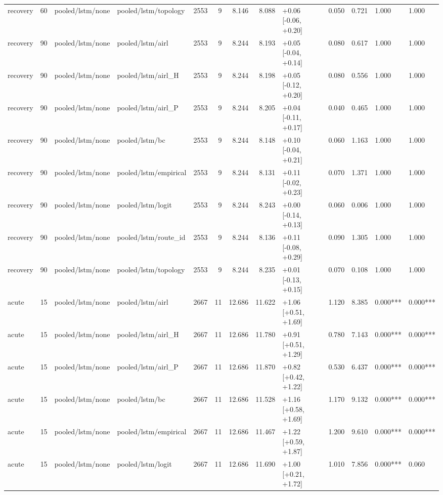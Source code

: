 \begin{tabular}{lrllrrrrlrrll}
recovery & 60 & pooled/lstm/none & pooled/lstm/topology & 2553 & 9 & 8.146 & 8.088 & +0.06 [-0.06, +0.20] & 0.050 & 0.721 & 1.000 & 1.000 \\
recovery & 90 & pooled/lstm/none & pooled/lstm/airl & 2553 & 9 & 8.244 & 8.193 & +0.05 [-0.04, +0.14] & 0.080 & 0.617 & 1.000 & 1.000 \\
recovery & 90 & pooled/lstm/none & pooled/lstm/airl_H & 2553 & 9 & 8.244 & 8.198 & +0.05 [-0.12, +0.20] & 0.080 & 0.556 & 1.000 & 1.000 \\
recovery & 90 & pooled/lstm/none & pooled/lstm/airl_P & 2553 & 9 & 8.244 & 8.205 & +0.04 [-0.11, +0.17] & 0.040 & 0.465 & 1.000 & 1.000 \\
recovery & 90 & pooled/lstm/none & pooled/lstm/bc & 2553 & 9 & 8.244 & 8.148 & +0.10 [-0.04, +0.21] & 0.060 & 1.163 & 1.000 & 1.000 \\
recovery & 90 & pooled/lstm/none & pooled/lstm/empirical & 2553 & 9 & 8.244 & 8.131 & +0.11 [-0.02, +0.23] & 0.070 & 1.371 & 1.000 & 1.000 \\
recovery & 90 & pooled/lstm/none & pooled/lstm/logit & 2553 & 9 & 8.244 & 8.243 & +0.00 [-0.14, +0.13] & 0.060 & 0.006 & 1.000 & 1.000 \\
recovery & 90 & pooled/lstm/none & pooled/lstm/route_id & 2553 & 9 & 8.244 & 8.136 & +0.11 [-0.08, +0.29] & 0.090 & 1.305 & 1.000 & 1.000 \\
recovery & 90 & pooled/lstm/none & pooled/lstm/topology & 2553 & 9 & 8.244 & 8.235 & +0.01 [-0.13, +0.15] & 0.070 & 0.108 & 1.000 & 1.000 \\
acute & 15 & pooled/lstm/none & pooled/lstm/airl & 2667 & 11 & 12.686 & 11.622 & +1.06 [+0.51, +1.69] & 1.120 & 8.385 & 0.000*** & 0.000*** \\
acute & 15 & pooled/lstm/none & pooled/lstm/airl_H & 2667 & 11 & 12.686 & 11.780 & +0.91 [+0.51, +1.29] & 0.780 & 7.143 & 0.000*** & 0.000*** \\
acute & 15 & pooled/lstm/none & pooled/lstm/airl_P & 2667 & 11 & 12.686 & 11.870 & +0.82 [+0.42, +1.22] & 0.530 & 6.437 & 0.000*** & 0.000*** \\
acute & 15 & pooled/lstm/none & pooled/lstm/bc & 2667 & 11 & 12.686 & 11.528 & +1.16 [+0.58, +1.69] & 1.170 & 9.132 & 0.000*** & 0.000*** \\
acute & 15 & pooled/lstm/none & pooled/lstm/empirical & 2667 & 11 & 12.686 & 11.467 & +1.22 [+0.59, +1.87] & 1.200 & 9.610 & 0.000*** & 0.000*** \\
acute & 15 & pooled/lstm/none & pooled/lstm/logit & 2667 & 11 & 12.686 & 11.690 & +1.00 [+0.21, +1.72] & 1.010 & 7.856 & 0.000*** & 0.060 \\

\end{tabular}
